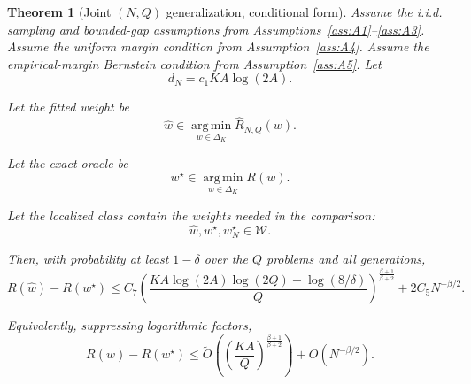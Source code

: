 \documentclass{article} %
\newtheorem{theorem}{Theorem}
\providecommand{\argmin}{\mathop{\mathrm{arg\,min}}\limits}
\providecommand{\simplex}{\Delta_K}
\providecommand{\Risk}{R}
\providecommand{\what}{\widehat{w}}
\providecommand{\wstar}{w^{\star}}
\begin{document}
\begin{theorem}[Joint \((N,Q)\) generalization, conditional form]
\label{thm:generalization}
Assume the i.i.d. sampling and bounded-gap assumptions from
Assumptions~\ref{ass:A1}--\ref{ass:A3}.  Assume the uniform margin condition
from Assumption~\ref{ass:A4}.  Assume the empirical-margin Bernstein condition
from Assumption~\ref{ass:A5}.  Let
\begin{equation}
\label{eq:thm2-KA}
d_N
=
c_1 K A\log(2A).
\end{equation}

Let the fitted weight be
\begin{equation}
\label{eq:thm2-what}
\what
\in
\argmin_{w\in\simplex}\widehat{\Risk}_{N,Q}(w).
\end{equation}

Let the exact oracle be
\begin{equation}
\label{eq:thm2-wstar}
\wstar
\in
\argmin_{w\in\simplex}\Risk(w).
\end{equation}

Let the localized class contain the weights needed in the comparison:
\begin{equation}
\label{eq:thm2-local-membership}
\what,\wstar,w_N^\star\in\mathcal W .
\end{equation}

Then, with probability at least \(1-\delta\) over the \(Q\) problems and all
generations,
\begin{equation}
\label{eq:thm2-bound}
\Risk(\what)-\Risk(\wstar)
\le
C_7
\left(
\frac{
K A\log(2A)\log(2Q)+\log(8/\delta)
}{Q}
\right)^{\frac{\beta+1}{\beta+2}}
+
2C_5N^{-\beta/2}.
\end{equation}

Equivalently, suppressing logarithmic factors,
\begin{equation}
\label{eq:thm2-tilde}
\Risk(\what)-\Risk(\wstar)
\le
\widetilde O
\left(
\left(\frac{KA}{Q}\right)^{\frac{\beta+1}{\beta+2}}
\right)
+
O\!\left(N^{-\beta/2}\right).
\end{equation}
\end{theorem}
\end{document}
